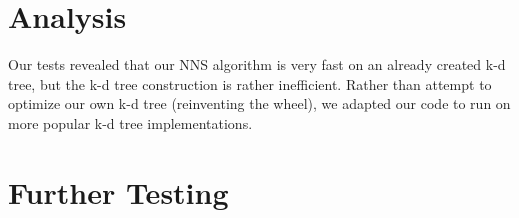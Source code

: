 \documentclass[a4paper,12pt,twocolumn]{article}
\begin{document}
\section{Analysis}
Our tests revealed that our NNS algorithm is very fast on an already created k-d tree, but
the k-d tree construction is rather inefficient.
Rather than attempt to optimize our own k-d tree (reinventing the wheel), we adapted
our code to run on more popular k-d tree implementations.

\section{Further Testing}
\end{document}
